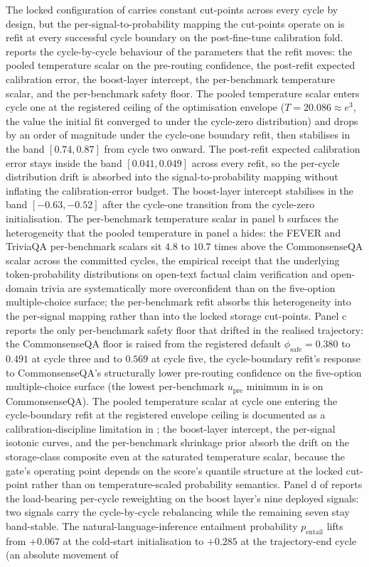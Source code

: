 The locked configuration of  carries constant cut-points across every cycle by design, but the per-signal-to-probability mapping the cut-points operate on is refit at every successful cycle boundary on the post-fine-tune calibration fold.  reports the cycle-by-cycle behaviour of the parameters that the refit moves: the pooled temperature scalar on the pre-routing confidence, the post-refit expected calibration error, the boost-layer intercept, the per-benchmark temperature scalar, and the per-benchmark safety floor. The pooled temperature scalar enters cycle one at the registered ceiling of the optimisation envelope ($T = 20.086 \approx e^{3}$, the value the initial fit converged to under the cycle-zero distribution) and drops by an order of magnitude under the cycle-one boundary refit, then stabilises in the band $[0.74, 0.87]$ from cycle two onward. The post-refit expected calibration error stays inside the band $[0.041, 0.049]$ across every refit, so the per-cycle distribution drift is absorbed into the signal-to-probability mapping without inflating the calibration-error budget. The boost-layer intercept stabilises in the band $[-0.63, -0.52]$ after the cycle-one transition from the cycle-zero initialisation. The per-benchmark temperature scalar in panel b surfaces the heterogeneity that the pooled temperature in panel a hides: the FEVER and TriviaQA per-benchmark scalars sit $4.8$ to $10.7$ times above the CommonsenseQA scalar across the committed cycles, the empirical receipt that the underlying token-probability distributions on open-text factual claim verification and open-domain trivia are systematically more overconfident than on the five-option multiple-choice surface; the per-benchmark refit absorbs this heterogeneity into the per-signal mapping rather than into the locked storage cut-points. Panel c reports the only per-benchmark safety floor that drifted in the realised trajectory: the CommonsenseQA floor is raised from the registered default $\phi_{\text{safe}} = 0.380$ to $0.491$ at cycle three and to $0.569$ at cycle five, the cycle-boundary refit's response to CommonsenseQA's structurally lower pre-routing confidence on the five-option multiple-choice surface (the lowest per-benchmark $u_{\text{pre}}$ minimum in  is on CommonsenseQA). The pooled temperature scalar at cycle one entering the cycle-boundary refit at the registered envelope ceiling is documented as a calibration-discipline limitation in ; the boost-layer intercept, the per-signal isotonic curves, and the per-benchmark shrinkage prior absorb the drift on the storage-class composite even at the saturated temperature scalar, because the gate's operating point depends on the score's quantile structure at the locked cut-point rather than on temperature-scaled probability semantics. Panel d of  reports the load-bearing per-cycle reweighting on the boost layer's nine deployed signals: two signals carry the cycle-by-cycle rebalancing while the remaining seven stay band-stable. The natural-language-inference entailment probability $p_{\text{entail}}$ lifts from $+0.067$ at the cold-start initialisation to $+0.285$ at the trajectory-end cycle (an absolute movement of 